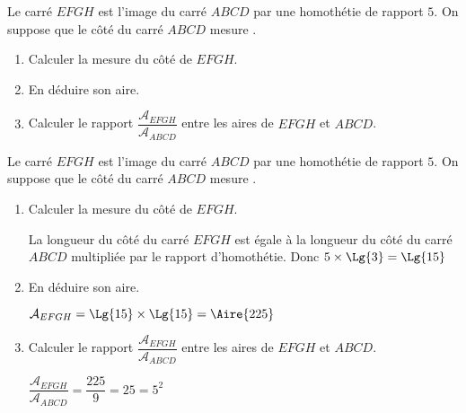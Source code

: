 \begin{exercice*}
    Le carré $EFGH$ est l'image du carré $ABCD$ par une homothétie de rapport $5$.
    On suppose que le côté du carré $ABCD$ mesure .
    \begin{enumerate}
        \item Calculer la mesure du côté de $EFGH$.
        \item En déduire son aire.
        \item Calculer le rapport $\dfrac{\mathcal{A}_{EFGH}}{\mathcal{A}_{ABCD}}$ entre les aires de $EFGH$ et $ABCD$.
    \end{enumerate}    
\end{exercice*}
\begin{corrige}
    Le carré $EFGH$ est l'image du carré $ABCD$ par une homothétie de rapport $5$.
    On suppose que le côté du carré $ABCD$ mesure .

    \begin{enumerate}
        \item Calculer la mesure du côté de $EFGH$.
        
        {\color{red}La longueur du côté du carré $EFGH$ est égale à la longueur du côté du carré $ABCD$ multipliée par le rapport d'homothétie.
        Donc $5\times \Lg{3}=\Lg{15}$}
        \item En déduire son aire.
        
        {\color{red} $\mathcal{A}_{EFGH}=\Lg{15}\times \Lg{15} = \Aire{225}$}
        \item Calculer le rapport $\dfrac{\mathcal{A}_{EFGH}}{\mathcal{A}_{ABCD}}$ entre les aires de $EFGH$ et $ABCD$.
        
        {\color{red} $\dfrac{\mathcal{A}_{EFGH}}{\mathcal{A}_{ABCD}}=\dfrac{225}{9}=25=5^2$}
    \end{enumerate}
\end{corrige}

